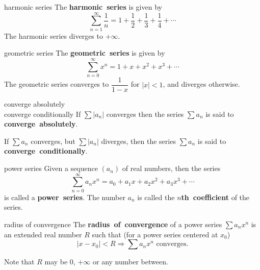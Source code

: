 \documentclass[avery5371,grid]{flashcards}
\begin{document}
\begin{flashcard}[Definition]{harmonic series}
The \mbox{\textbf{harmonic series}} is given by
\begin{equation*}
\sum_{n=1}^{\infty} \dfrac{1}{n} =
1 + \dfrac{1}{2} + \dfrac{1}{3} + \dfrac{1}{4} + \cdots
\end{equation*}
The harmonic series diverges to $+\infty$.
\end{flashcard}

\begin{flashcard}[Definition]{geometric series}
The \mbox{\textbf{geometric series}} is given by
\begin{equation*}
\sum_{n=0}^{\infty} x^{n} = 1 + x + x^2 + x^3 + \cdots
\end{equation*}
The geometric series converges to $\dfrac{1}{1-x}$ for $|x|<1$, and
diverges otherwise.
\end{flashcard}

\begin{flashcard}[Definition]{converge absolutely\\
converge conditionally}
If $\sum |a_n|$ converges then the series $\sum a_n$ is said to
\mbox{\textbf{converge absolutely}}.

\bigskip
If $\sum a_n$ converges, but $\sum |a_n|$ diverges, then the series
$\sum a_n$ is said to \mbox{\textbf{converge conditionally}}.
\end{flashcard}

\begin{flashcard}[Definition]{power series}
Given a sequence $(a_n)$ of real numbers, then the series
\begin{equation*}
\sum_{n=0}^{\infty} a_n x^n = a_0 + a_1x + a_2x^2 + a_3x^3 + \cdots
\end{equation*}
is called a \mbox{\textbf{power series}}.  The number $a_n$ is called
the \mbox{\textbf{$n$th coefficient}} of the series.
\end{flashcard}

\begin{flashcard}[Definition]{radius of convergence}
The \mbox{\textbf{radius of convergence}} of a power series
$\sum a_n x^n$ is an extended real number $R$ such that (for a power
series centered at $x_0$)
\begin{equation*}
|x-x_0|<R \Rightarrow \sum a_n x^n \textrm{ converges.}
\end{equation*}

\medskip
Note that $R$ may be $0$, $+\infty$ or any number between.
\end{flashcard}
\end{document}
